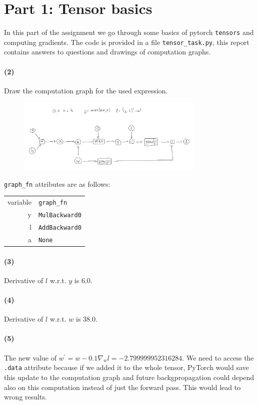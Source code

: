 \documentclass[a4paper,11pt]{article}
\begin{document}
\section{Part 1: Tensor basics}
In this part of the assignment we go through some basics of pytorch \texttt{tensors} and computing gradients.
The code is provided in a file \texttt{tensor\_task.py}, this report contains answers to questions and drawings of computation graphs.

\paragraph{(2)} Draw the computation graph for the used expression.
\begin{figure}[ht]
    \centering
    \includegraphics[width=0.8\textwidth]{./DAG.png}
\end{figure}

\texttt{graph\_fn} attributes are as follows:
\begin{table}[ht]
    \centering
    \begin{tabular}{r | l}
        variable & \texttt{graph\_fn}    \\
        y        & \texttt{MulBackward0} \\
        l        & \texttt{AddBackward0} \\
        a        & \texttt{None}         \\
    \end{tabular}
\end{table}

\paragraph{(3)} Derivative of $l$ w.r.t. $y$ is $6.0$.

\paragraph{(4)} Derivative of $l$ w.r.t. $w$ is $38.0$.

\paragraph{(5)} The new value of $w^{\prime} = w - 0.1\nabla_{w}l = -2.799999952316284$.
We need to access the \texttt{.data} attribute because if we added it to the whole tensor, PyTorch would save this update to the computation graph and future backgpropagation could depend also on this computation instead of just the forward pass.
This would lead to wrong results.
\end{document}
